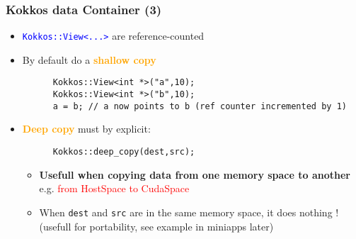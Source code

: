\begin{frame}[fragile=singleslide]
  \frametitle{Kokkos data Container (3)}

  \begin{itemize}
  \item \textcolor{blue}{\texttt{Kokkos::View<...>}} are reference-counted
  \item By default do a \textcolor{orange}{\textbf{shallow copy}}
    \begin{verbatim}
      Kokkos::View<int *>("a",10);
      Kokkos::View<int *>("b",10);
      a = b; // a now points to b (ref counter incremented by 1)
    \end{verbatim}
  \item \textcolor{orange}{\textbf{Deep copy}} must by explicit:
    \begin{verbatim}
      Kokkos::deep_copy(dest,src);
    \end{verbatim}
    \begin{itemize}
    \item \textbf{Usefull when copying data from one memory space to another}\\
      e.g. \textcolor{red}{from HostSpace to CudaSpace}
    \item When \texttt{dest} and \texttt{src} are in the same memory space, it does nothing ! (usefull for portability, see example in miniapps later)
    \end{itemize}
  \end{itemize}

\end{frame}
